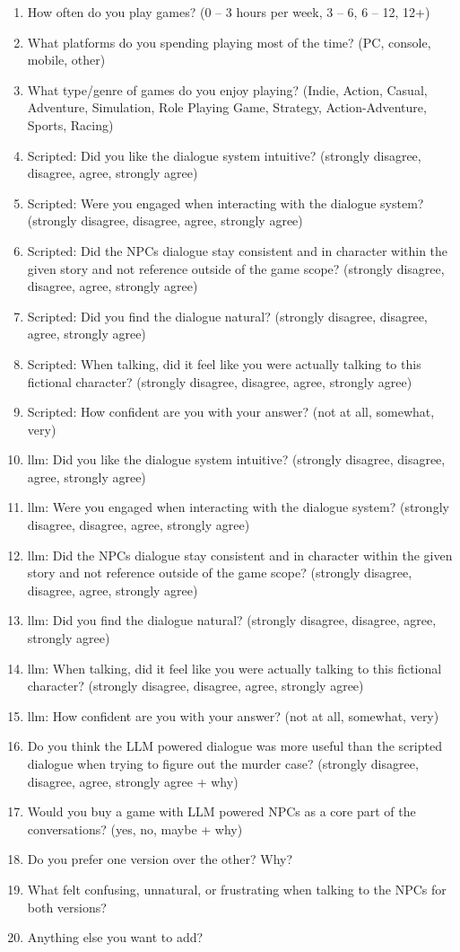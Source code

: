 \documentclass[12pt, a4paper]{report}
\begin{document}
	\begin{enumerate}
		\item How often do you play games? (0 – 3 hours per week, 3 – 6, 6 – 12, 12+)
		\item What platforms do you spending playing most of the time? (PC, console, mobile, other)
		\item What type/genre of games do you enjoy playing? (Indie, Action, Casual, Adventure, Simulation, Role Playing Game, Strategy, Action-Adventure, Sports, Racing)
		\item Scripted: Did you like the dialogue system intuitive? (strongly disagree, disagree, agree, strongly agree)
		\item Scripted: Were you engaged when interacting with the dialogue system? (strongly disagree, disagree, agree, strongly agree)
		\item Scripted: Did the NPCs dialogue stay consistent and in character within the given story and not reference outside of the game scope? (strongly disagree, disagree, agree, strongly agree)
		\item Scripted: Did you find the dialogue natural? (strongly disagree, disagree, agree, strongly agree)
		\item Scripted: When talking, did it feel like you were actually talking to this fictional character? (strongly disagree, disagree, agree, strongly agree)
		\item Scripted: How confident are you with your answer? (not at all, somewhat, very)
		\item \gls{llm}: Did you like the dialogue system intuitive? (strongly disagree, disagree, agree, strongly agree)
		\item \gls{llm}: Were you engaged when interacting with the dialogue system? (strongly disagree, disagree, agree, strongly agree)
		\item \gls{llm}: Did the NPCs dialogue stay consistent and in character within the given story and not reference outside of the game scope? (strongly disagree, disagree, agree, strongly agree)
		\item \gls{llm}: Did you find the dialogue natural? (strongly disagree, disagree, agree, strongly agree)
		\item \gls{llm}: When talking, did it feel like you were actually talking to this fictional character? (strongly disagree, disagree, agree, strongly agree)
		\item \gls{llm}: How confident are you with your answer? (not at all, somewhat, very)
		\item Do you think the LLM powered dialogue was more useful than the scripted dialogue when trying to figure out the murder case? (strongly disagree, disagree, agree, strongly agree + why)
		\item Would you buy a game with LLM powered NPCs as a core part of the conversations? (yes, no, maybe + why)
		\item Do you prefer one version over the other? Why?
		\item What felt confusing, unnatural, or frustrating when talking to the NPCs for both versions?
		\item Anything else you want to add?
	\end{enumerate}
	
\end{document}
